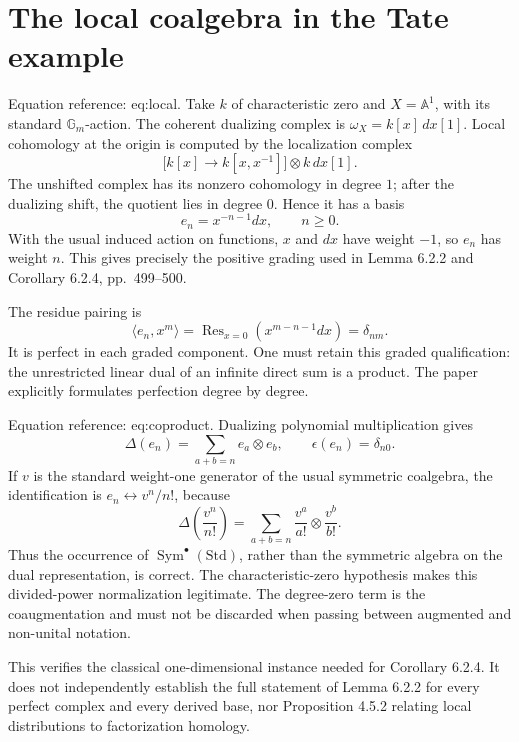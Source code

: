 \documentclass[10pt]{article}
\begin{document}
\section*{The local coalgebra in the Tate example}
Equation reference: eq:local. Take \(k\) of characteristic zero and \(X=\mathbb A^1\), with its standard \(\mathbb G_m\)-action. The coherent dualizing complex is \(\omega_X=k[x]\,dx[1]\). Local cohomology at the origin is computed by the localization complex \[\bigl[k[x]\longrightarrow k[x,x^{-1}]\bigr]\otimes k\,dx[1].
 \] The unshifted complex has its nonzero cohomology in degree \(1\); after the dualizing shift, the quotient lies in degree \(0\). Hence it has a basis \[e_n=x^{-n-1}dx,\qquad n\geq0.\] With the usual induced action on functions, \(x\) and \(dx\) have weight \(-1\), so \(e_n\) has weight \(n\). This gives precisely the positive grading used in Lemma 6.2.2 and Corollary 6.2.4, pp. 499–500.\par
The residue pairing is \[\langle e_n,x^m\rangle=\operatorname{Res}_{x=0}(x^{m-n-1}dx)
 =\delta_{nm}.\] It is perfect in each graded component. One must retain this graded qualification: the unrestricted linear dual of an infinite direct sum is a product. The paper explicitly formulates perfection degree by degree.\par
Equation reference: eq:coproduct. Dualizing polynomial multiplication gives \[\Delta(e_n)=\sum_{a+b=n}e_a\otimes e_b,\qquad
 \epsilon(e_n)=\delta_{n0}.
 \] If \(v\) is the standard weight-one generator of the usual symmetric coalgebra, the identification is \(e_n\leftrightarrow v^n/n!\), because \[\Delta\!\left(\frac{v^n}{n!}\right)
 =\sum_{a+b=n}\frac{v^a}{a!}\otimes\frac{v^b}{b!}.\] Thus the occurrence of \(\operatorname{Sym}^{\bullet}(\mathrm{Std})\), rather than the symmetric algebra on the dual representation, is correct. The characteristic-zero hypothesis makes this divided-power normalization legitimate. The degree-zero term is the coaugmentation and must not be discarded when passing between augmented and non-unital notation.\par
This verifies the classical one-dimensional instance needed for Corollary 6.2.4. It does not independently establish the full statement of Lemma 6.2.2 for every perfect complex and every derived base, nor Proposition 4.5.2 relating local distributions to factorization homology.\par
\end{document}

